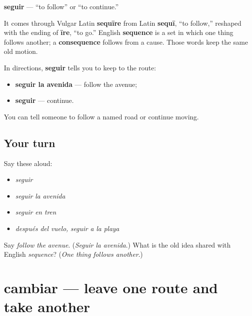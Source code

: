 \begin{cousinweb}
\textbf{seguir} — \textquotedblleft{}to follow\textquotedblright{} or \textquotedblleft{}to continue.\textquotedblright{}

It comes through Vulgar Latin \textbf{sequīre} from Latin \textbf{sequī}, \textquotedblleft{}to follow,\textquotedblright{} reshaped with the ending of \textbf{īre}, \textquotedblleft{}to go.\textquotedblright{} English \textbf{sequence} is a set in which one thing follows another; a \textbf{consequence} follows from a cause. Those words keep the same old motion.

In directions, \textbf{seguir} tells you to keep to the route:

\begin{itemize}
\raggedright
  \item \textbf{seguir la avenida} — follow the avenue;
  \item \textbf{seguir} — continue.
\end{itemize}
\end{cousinweb}

\begin{grammarlens}[title={What you've built}]
You can tell someone to follow a named road or continue moving.
\end{grammarlens}

\subsection*{Your turn}
Say these aloud:

\begin{itemize}
\raggedright
  \item \emph{seguir}
  \item \emph{seguir la avenida}
  \item \emph{seguir en tren}
  \item \emph{después del vuelo, seguir a la playa}
\end{itemize}

\begin{tcolorbox}[breakable,colback=teal!4,colframe=teal!35!black,title={Before you move on}]
Say \emph{follow the avenue}. (\emph{Seguir la avenida}.) What is the old idea shared with English \emph{sequence}? (\emph{One thing follows another}.)
\end{tcolorbox}
\section[cambiar]{cambiar — leave one route and take another}

